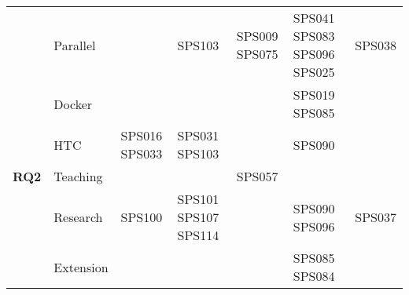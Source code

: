 \begin{table*}[htbp]
\begin{tabularx}{\textwidth}{p{0.8cm}p{2.5cm}>{\raggedright\arraybackslash}X>{\raggedright\arraybackslash}X>{\raggedright\arraybackslash}X>{\raggedright\arraybackslash}X>{\raggedright\arraybackslash}X}
		\addlinespace[0.3em]
		                                     & Parallel                &                      & SPS103               & SPS009 SPS075        & SPS041 SPS083 SPS096 SPS025        & SPS038             \\
		\addlinespace[0.3em]
		                                     & Docker                  &                      &                      &                      & SPS019 SPS085                      &                    \\
		\addlinespace[0.3em]
		                                     & HTC                     & SPS016 SPS033        & SPS031 SPS103        &                      & SPS090                             &                    \\
		\midrule
		\multirow{0}{*}[1.2em]{\textbf{RQ2}} & Teaching                &                      &                      & SPS057               &                                    &                    \\
		\addlinespace[0.3em]
		                                     & Research                & SPS100               & SPS101 SPS107 SPS114 &                      & SPS090 SPS096                      & SPS037             \\
		\addlinespace[0.3em]
		                                     & Extension               &                      &                      &                      & SPS085 SPS084                      &                    \\
		\bottomrule
	\end{tabularx}
\end{table*}

